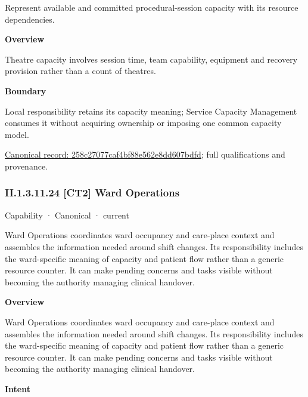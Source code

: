 Represent available and committed procedural-session capacity with its resource dependencies.



\textbf{Overview}



Theatre capacity involves session time, team capability, equipment and recovery provision rather than a count of theatres.



\textbf{Boundary}



Local responsibility retains its capacity meaning; Service Capacity Management consumes it without acquiring ownership or imposing one common capacity model.


{\footnotesize \href{../../../../continuum/strategy/capability/feature/258c27077caf4bf88e562e8dd607bdfd.md}{Canonical record: 258c27077caf4bf88e562e8dd607bdfd}; full qualifications and provenance.}\par
\subsubsection*{II.1.3.11.24 [CT2] Ward Operations}
\label{navigation:II.1.3.11.24}

\label{element:f996ecca728f4942a88b034aca818a99}
{\small Capability · Canonical · current}\par

Ward Operations coordinates ward occupancy and care-place context and assembles the information needed around shift changes. Its responsibility includes the ward-specific meaning of capacity and patient flow rather than a generic resource counter. It can make pending concerns and tasks visible without becoming the authority managing clinical handover.



\textbf{Overview}



Ward Operations coordinates ward occupancy and care-place context and assembles the information needed around shift changes. Its responsibility includes the ward-specific meaning of capacity and patient flow rather than a generic resource counter. It can make pending concerns and tasks visible without becoming the authority managing clinical handover.



\textbf{Intent}



